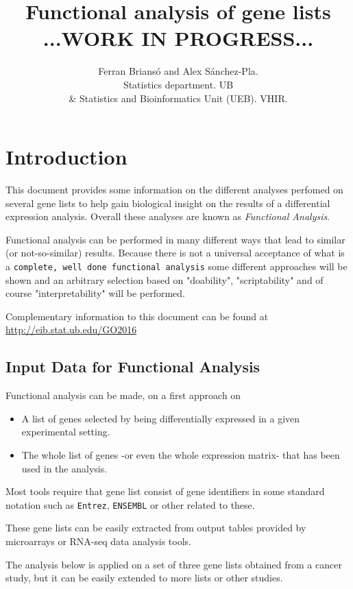 \documentclass{article}\usepackage[]{graphicx}\usepackage[]{color}
\title{Functional analysis of gene lists\\
\textbf{...WORK IN PROGRESS...}}
\author{Ferran Brians\'o and Alex S\'anchez-Pla. \\ Statistics department. UB \\ \& Statistics and Bioinformatics Unit (UEB). VHIR.}
\begin{document}
\maketitle
\tableofcontents








\section{Introduction}

This document provides some information on the different analyses perfomed on several gene lists to help gain biological insight on the results of a differential expression analysis. Overall these analyses are known as \emph{Functional Analysis}.

Functional analysis can be performed in many different ways that lead to similar (or not-so-similar) results.  Because there is not a universal acceptance of what is a \texttt{complete, well done functional analysis} some different approaches will be shown and an arbitrary selection based on "doability", "scriptability" and of course "interpretability" will be performed.

Complementary information to this document can be found at \url{http://eib.stat.ub.edu/GO2016}

\subsection{Input Data for Functional Analysis}

Functional analysis can be made, on a first approach on
\begin{itemize}
\item A list of genes selected by being differentially expressed in a given experimental setting.
\item The whole list of genes -or even the whole expression matrix- that has been used in the analysis.
\end{itemize}

Most tools require that gene list consist of gene identifiers in some standard notation such as \texttt{Entrez}, \texttt{ENSEMBL} or other related to these.

These gene lists can be easily extracted from output tables provided by microarrays or RNA-seq data analysis tools.

The analysis below is applied on a set of three gene lists obtained from a cancer study, but it can be easily extended to more lists or other studies.
\end{document}

